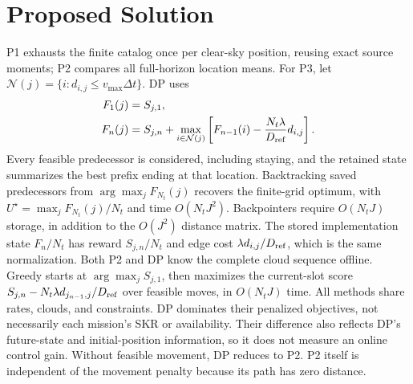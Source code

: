 \section{Proposed Solution}
\label{sec:method}
P1 exhausts the finite catalog once per clear-sky position, reusing exact
source moments; P2 compares all full-horizon location means. For P3, let
$\mathcal N(j)=\{i:d_{i,j}\le v_{\max}\Delta t\}$. DP uses
\begin{align}
 F_1(j)&=S_{j,1},\label{eq:dp_init}\\
 F_n(j)&=S_{j,n}+\max_{i\in\mathcal N(j)}
 \left[F_{n-1}(i)-\frac{N_t\lambda}{D_{\rm ref}}d_{i,j}\right].
 \label{eq:dp}
\end{align}
Every feasible predecessor is considered, including staying, and the
retained state summarizes the best prefix ending at that location.
Backtracking saved predecessors from $\arg\max_jF_{N_t}(j)$ recovers the
finite-grid optimum, with $U^\star=\max_jF_{N_t}(j)/N_t$ and time
$O(N_tJ^2)$. Backpointers require $O(N_tJ)$ storage, in addition to the
$O(J^2)$ distance matrix. The stored implementation state $F_n/N_t$
has reward $S_{j,n}/N_t$ and edge cost $\lambda d_{i,j}/D_{\rm ref}$,
which is the same normalization. Both P2 and DP know the complete cloud sequence offline.
Greedy starts at $\arg\max_jS_{j,1}$, then maximizes the current-slot
score $S_{j,n}-N_t\lambda d_{j_{n-1},j}/D_{\rm ref}$ over feasible moves,
in $O(N_tJ)$ time. All methods share rates, clouds, and constraints.
DP dominates their penalized objectives, not necessarily each mission's
SKR or availability. Their difference also reflects DP's future-state and
initial-position information, so it does not measure an online control gain.
Without feasible movement, DP reduces to P2. P2 itself is independent of
the movement penalty because its path has zero distance.

